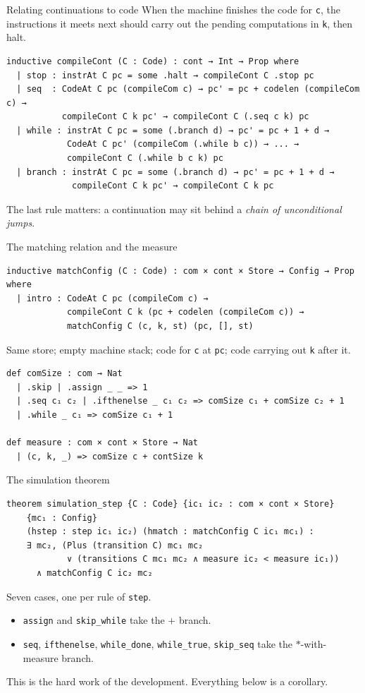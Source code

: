 \documentclass[aspectratio=169,10pt]{beamer}
\newcommand{\code}[1]{\texttt{\small #1}}
\begin{document}
\begin{frame}[fragile]{Relating continuations to code}
When the machine finishes the code for \code{c}, the instructions it meets
next should carry out the pending computations in \code{k}, then halt.
\begin{lstlisting}
inductive compileCont (C : Code) : cont → Int → Prop where
  | stop : instrAt C pc = some .halt → compileCont C .stop pc
  | seq  : CodeAt C pc (compileCom c) → pc' = pc + codelen (compileCom c) →
           compileCont C k pc' → compileCont C (.seq c k) pc
  | while : instrAt C pc = some (.branch d) → pc' = pc + 1 + d →
            CodeAt C pc' (compileCom (.while b c)) → ... →
            compileCont C (.while b c k) pc
  | branch : instrAt C pc = some (.branch d) → pc' = pc + 1 + d →
             compileCont C k pc' → compileCont C k pc
\end{lstlisting}
The last rule matters: a continuation may sit behind a \emph{chain of
unconditional jumps}.
\end{frame}

\begin{frame}[fragile]{The matching relation and the measure}
\begin{lstlisting}
inductive matchConfig (C : Code) : com × cont × Store → Config → Prop where
  | intro : CodeAt C pc (compileCom c) →
            compileCont C k (pc + codelen (compileCom c)) →
            matchConfig C (c, k, st) (pc, [], st)
\end{lstlisting}
Same store; empty machine stack; code for \code{c} at \code{pc}; code
carrying out \code{k} after it.
\begin{lstlisting}
def comSize : com → Nat
  | .skip | .assign _ _ => 1
  | .seq c₁ c₂ | .ifthenelse _ c₁ c₂ => comSize c₁ + comSize c₂ + 1
  | .while _ c₁ => comSize c₁ + 1

def measure : com × cont × Store → Nat
  | (c, k, _) => comSize c + contSize k
\end{lstlisting}
\end{frame}

\begin{frame}[fragile]{The simulation theorem}
\begin{lstlisting}
theorem simulation_step {C : Code} {ic₁ ic₂ : com × cont × Store}
    {mc₁ : Config}
    (hstep : step ic₁ ic₂) (hmatch : matchConfig C ic₁ mc₁) :
    ∃ mc₂, (Plus (transition C) mc₁ mc₂
            ∨ (transitions C mc₁ mc₂ ∧ measure ic₂ < measure ic₁))
      ∧ matchConfig C ic₂ mc₂
\end{lstlisting}
Seven cases, one per rule of \code{step}.
\medskip

\begin{itemize}
\item \code{assign} and \code{skip\_while} take the $+$ branch.
\item \code{seq}, \code{ifthenelse}, \code{while\_done}, \code{while\_true},
      \code{skip\_seq} take the $*$-with-measure branch.
\end{itemize}
\medskip

This is the hard work of the development.  Everything below is a corollary.
\end{frame}
\end{document}
